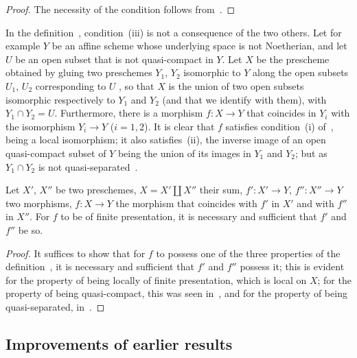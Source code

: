 \begin{proof}
The necessity of the condition follows from~.
\end{proof}

\begin{remark}[1.6.4]
\label{IV.1.6.4}
In the definition~, condition~(iii) is not a consequence of the two others.
Let for example $Y$ be an affine scheme whose underlying space is not Noetherian, and let $U$ be an open subset that is not quasi-compact in $Y$.
Let $X$ be the prescheme obtained by gluing two preschemes $Y_1$, $Y_2$ isomorphic to $Y$ along the open subsets $U_1$, $U_2$ corresponding to $U$ , so that $X$ is the union of two open subsets isomorphic respectively to $Y_1$ and $Y_2$ (and that we identify with them), with $Y_1\cap Y_2=U$.
Furthermore, there is a morphism $f:X\to Y$ that coincides in $Y_i$ with the isomorphism $Y_i\to Y$ ($i=1,2$).
It is clear that $f$ satisfies condition~(i) of~, being a local isomorphism; it also satisfies~(ii), the inverse image of an open quasi-compact subset of $Y$ being the union of its images in $Y_1$ and $Y_2$; but as $Y_1\cap Y_2$ is not quasi-separated~.
\end{remark}

\begin{proposition}[1.6.5]
\label{IV.1.6.5}
Let $X'$, $X''$ be two preschemes, $X=X'\amalg X''$ their sum, $f':X'\to Y$, $f'':X''\to Y$ two morphisms, $f:X\to Y$ the morphism that coincides with $f'$ in $X'$ and with $f''$ in $X''$.
For $f$ to be of finite presentation, it is necessary and sufficient that $f'$ and $f''$ be so.
\end{proposition}

\begin{proof}
It suffices to show that for $f$ to possess one of the three properties of the definition~,
it is necessary and sufficient that $f'$ and $f''$ possess it; this is evident for the property of being locally of finite presentation, which is local on $X$; for the property of being quasi-compact, this was seen in~, and for the property of being quasi-separated, in~.
\end{proof}

\subsection{Improvements of earlier results}
\label{subsection:IV.1.7}

